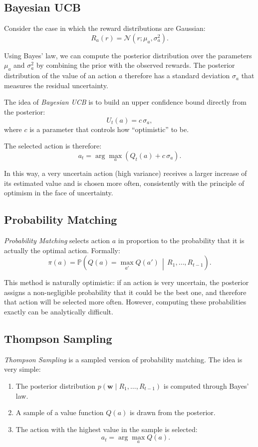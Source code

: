 \subsection{Bayesian UCB}

Consider the case in which the reward distributions are Gaussian:
\[
R_a(r) = \mathcal{N}(r; \mu_a, \sigma_a^2).
\]

Using Bayes' law, we can compute the posterior distribution over the parameters $\mu_a$ and $\sigma_a^2$ by combining the prior with the observed rewards. The posterior distribution of the value of an action $a$ therefore has a standard deviation $\sigma_a$ that measures the residual uncertainty.

The idea of \emph{Bayesian UCB} is to build an upper confidence bound directly from the posterior:
\[
U_t(a) = c\, \sigma_a,
\]
where $c$ is a parameter that controls how “optimistic” to be.

The selected action is therefore:
\[
a_t = \arg\max_a \left( Q_t(a) + c\, \sigma_a \right).
\]

In this way, a very uncertain action (high variance) receives a larger increase of its estimated value and is chosen more often, consistently with the principle of optimism in the face of uncertainty.

\subsection{Probability Matching}

\emph{Probability Matching} selects action $a$ in proportion to the probability that it is actually the optimal action. Formally:
\[
\pi(a) = \mathbb{P}\!\left( Q(a) = \max_{a'} Q(a') \,\middle|\, R_1, \dots, R_{t-1} \right).
\]

This method is naturally optimistic: if an action is very uncertain, the posterior assigns a non-negligible probability that it could be the best one, and therefore that action will be selected more often. However, computing these probabilities exactly can be analytically difficult.

\subsection{Thompson Sampling}

\emph{Thompson Sampling} is a sampled version of probability matching. The idea is very simple:

\begin{enumerate}
    \item The posterior distribution $p(\mathbf{w}\mid R_1,\dots,R_{t-1})$ is computed through Bayes' law.
    \item A sample of a value function $Q(a)$ is drawn from the posterior.
    \item The action with the highest value in the sample is selected:
    \[
    a_t = \arg\max_a Q(a).
    \]
\end{enumerate}

